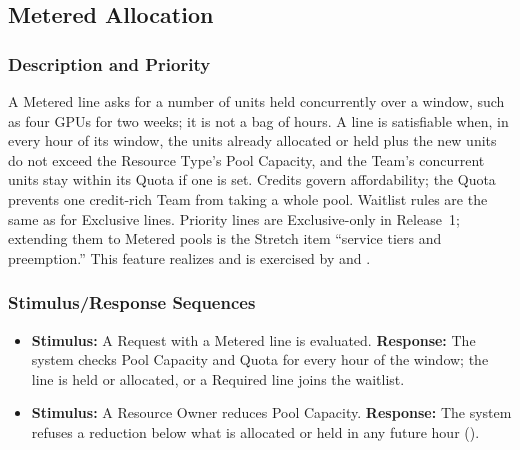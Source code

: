\subsection{Metered Allocation}\label{feat:metered}

\subsubsection{Description and Priority}
A Metered line asks for a number of units held concurrently over a window, such as four GPUs for two weeks; it is not a bag of hours. A line is satisfiable when, in every hour of its window, the units already allocated or held plus the new units do not exceed the Resource Type's Pool Capacity, and the Team's concurrent units stay within its Quota if one is set. Credits govern affordability; the Quota prevents one credit-rich Team from taking a whole pool. Waitlist rules are the same as for Exclusive lines. Priority lines are Exclusive-only in Release~1; extending them to Metered pools is the Stretch item ``service tiers and preemption.'' This feature realizes  and is exercised by  and . 

\subsubsection{Stimulus/Response Sequences}
\begin{itemize}
  \item \textbf{Stimulus:} A Request with a Metered line is evaluated. \textbf{Response:} The system checks Pool Capacity and Quota for every hour of the window; the line is held or allocated, or a Required line joins the waitlist.
  \item \textbf{Stimulus:} A Resource Owner reduces Pool Capacity. \textbf{Response:} The system refuses a reduction below what is allocated or held in any future hour ().
\end{itemize}

